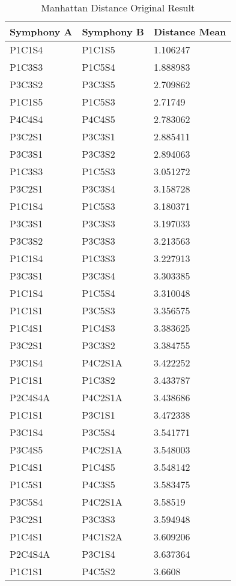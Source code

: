 \begin{longtable}{|l|l|l|}
\caption{Manhattan Distance Original Result}
\label{my-label}\\
\hline
Symphony A & Symphony B & Distance Mean \\ \hline
\endfirsthead
%
\endhead
%
P1C1S4 & P1C1S5 & 1.106247 \\ \hline
P1C3S3 & P1C5S4 & 1.888983 \\ \hline
P3C3S2 & P3C3S5 & 2.709862 \\ \hline
P1C1S5 & P1C5S3 & 2.71749 \\ \hline
P4C4S4 & P4C4S5 & 2.783062 \\ \hline
P3C2S1 & P3C3S1 & 2.885411 \\ \hline
P3C3S1 & P3C3S2 & 2.894063 \\ \hline
P1C3S3 & P1C5S3 & 3.051272 \\ \hline
P3C2S1 & P3C3S4 & 3.158728 \\ \hline
P1C1S4 & P1C5S3 & 3.180371 \\ \hline
P3C3S1 & P3C3S3 & 3.197033 \\ \hline
P3C3S2 & P3C3S3 & 3.213563 \\ \hline
P1C1S4 & P1C3S3 & 3.227913 \\ \hline
P3C3S1 & P3C3S4 & 3.303385 \\ \hline
P1C1S4 & P1C5S4 & 3.310048 \\ \hline
P1C1S1 & P3C5S3 & 3.356575 \\ \hline
P1C4S1 & P1C4S3 & 3.383625 \\ \hline
P3C2S1 & P3C3S2 & 3.384755 \\ \hline
P3C1S4 & P4C2S1A & 3.422252 \\ \hline
P1C1S1 & P1C3S2 & 3.433787 \\ \hline
P2C4S4A & P4C2S1A & 3.438686 \\ \hline
P1C1S1 & P3C1S1 & 3.472338 \\ \hline
P3C1S4 & P3C5S4 & 3.541771 \\ \hline
P3C4S5 & P4C2S1A & 3.548003 \\ \hline
P1C4S1 & P1C4S5 & 3.548142 \\ \hline
P1C5S1 & P4C3S5 & 3.583475 \\ \hline
P3C5S4 & P4C2S1A & 3.58519 \\ \hline
P3C2S1 & P3C3S3 & 3.594948 \\ \hline
P1C4S1 & P4C1S2A & 3.609206 \\ \hline
P2C4S4A & P3C1S4 & 3.637364 \\ \hline
P1C1S1 & P4C5S2 & 3.6608 \\ \hline
\end{longtable}

